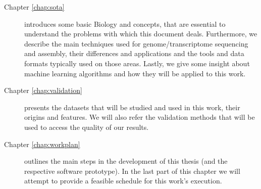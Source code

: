 \begin{description}

  \item[Chapter \ref{chap:sota}]
  introduces some basic Biology and \rnaseq{} concepts, that are essential to
  understand the problems with which this document deals. Furthermore, we
  describe the main techniques used for genome/transcriptome sequencing and
  assembly, their differences and applications and the tools and data formats
  typically used on those areas. Lastly, we give some insight about machine
  learning algorithms and how they will be applied to this work.

  \item[Chapter \ref{chap:validation}]
  presents the datasets that will be studied and used in this work, their
  origins and features. We will also refer the validation methods that will
  be used to access the quality of our results.

  \item[Chapter \ref{chap:workplan}]
  outlines the main steps in the development of this thesis (and the respective
  software prototype). In the last part of this chapter we will attempt to
  provide a feasible schedule for this work's execution.

\end{description}
